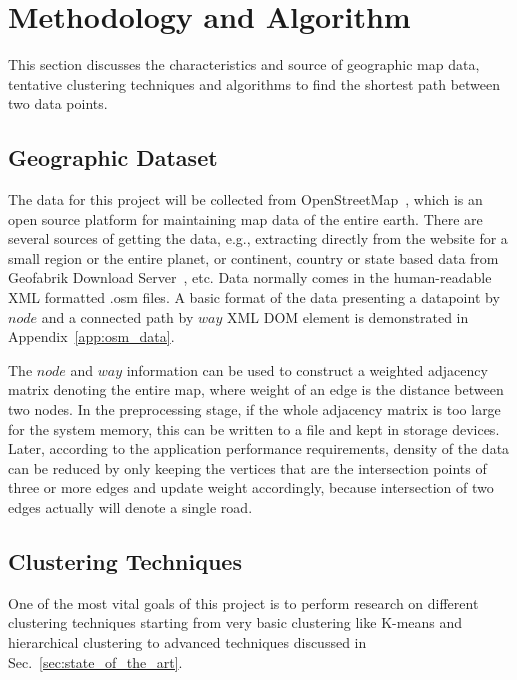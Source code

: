 \section{Methodology and Algorithm}
\label{sec:methodology}

This section discusses the characteristics and source of geographic map data,
tentative clustering techniques and algorithms to find the shortest
path between two data points.

\subsection{Geographic Dataset}
The data for this project will be collected from OpenStreetMap~\cite{osm},
which is an open source platform for maintaining map data of the entire earth.
There are several sources of getting the data, e.g., extracting directly from
the website for a small region or the entire planet, or continent, country or
state based data from Geofabrik Download Server~\cite{geo_dl_server}, etc.
Data normally comes in the human-readable XML formatted .osm files.
A basic format of the data presenting a datapoint by
$node$ and a connected path by $way$ XML DOM element
is demonstrated in Appendix~\ref{app:osm_data}.

The $node$ and $way$ information can be used to construct a weighted adjacency
matrix denoting the entire map, where weight of an edge is the distance between
two nodes.
In the preprocessing stage, if the whole adjacency matrix is too large for
the system memory, this can be written to a file and kept in storage devices.
Later, according to the application performance requirements, density of the
data can be reduced by only keeping the vertices that are the intersection
points of three or more edges and update weight accordingly,
because intersection of two edges actually will denote a single road.

\subsection{Clustering Techniques}

One of the most vital goals of this project is to perform research on different
clustering techniques starting from very basic clustering like K-means
and hierarchical clustering to advanced techniques discussed in
Sec.~\ref{sec:state_of_the_art}.~\cite{structural_attribute_similarity_clustering, deep_representation_graph_clustering, parallel_graph_algorithm}

